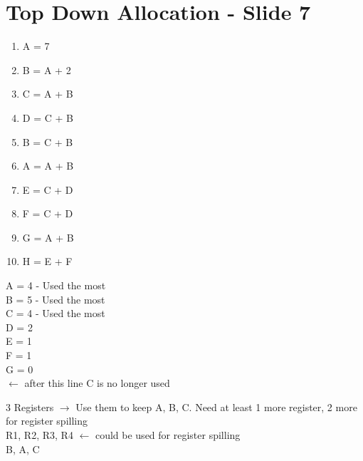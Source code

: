 \documentclass{report}
\begin{document}
\section{Top Down Allocation - Slide 7}
\vspace{-1em}
\begin{multicols}{2}
  \begin{enumerate}
    \item A = 7
    \item B = A + 2
    \item C = A + B
    \item D = C + B
    \item B = C + B
    \item A = A + B
    \item E = C + D
    \item F = C + D
    \item G = A + B
    \item H = E + F
  \end{enumerate}
  A = 4	- Used the most \\
  B = 5	- Used the most \\
  C = 4	- Used the most \\
  D = 2 \\
  E = 1 \\
  F = 1 \\
  G = 0 \\
  $\leftarrow$ after this line C is no longer used\\
\end{multicols}
\vspace{-1em}
3 Registers $\rightarrow$ Use them to keep A, B, C. Need at least 1 more register, 2 more for register spilling \\
R1, R2, R3, R4 $\leftarrow$ could be used for register spilling \\
B, \hspace{.75em}A, \hspace{.5em}C
\end{document}
